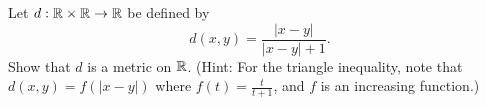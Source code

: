 {\begin{comment}
Suppose $x=y$. Then $d(x,y) = |\ln(1)| = 0$. Conversely, suppose $d(x,y) = 0$. Then $|\ln(y/x)| = 0$. This implies that $\frac{y}{x} = 1$ or that $x=y$. 

Finally, we verify the triangle inequality. Let $z \in X$. Then
\begin{align*} 
d(x,y) + d(y,z) &= |\ln(y/x)| + |\ln(z/y)| \\
	&= |\ln(y) - \ln(x)| + |\ln(z) - \ln(y)| \\
	&= |\ln(x) - \ln(y)| + |\ln(y) - \ln(z)| \\
	&\geq |\ln(x) - \ln(z)| \\
	&= d(x,z).
\end{align*}

We conclude that $d$ is a metric on $X$. 

\end{comment}

\item \label{ex:1_over_1_plus_t_metric} Let $d: \mathbb{R} \times \mathbb{R} \to \mathbb{R}$ be defined by 
\[d(x,y) = \frac{|x-y|}{|x-y|+1}.\]
Show that $d$ is a metric on $\mathbb{R}$. (Hint: For the triangle inequality, note that $d(x,y) = f(|x-y|)$ where $f(t) = \frac{t}{t+1}$, and $f$ is an increasing function.)

\begin{comment}

\ExerciseSolution Let $x, y, z \in \R$. By definition, $d(x,y) \geq 0$. Also, 
\[d(x,y) = \frac{|x-y|}{|x-y|+1} = \frac{|y-x|}{|y-x|+1} = d(y,x).\]

If $x=y$, then $|x-y| = 0$ and $d(x,y) = 0$. Conversely, if $d(x,y) = 0$, then it follows that $|x-y| = 0$ or $x=y$. 

Finally, we demonstrate the triangle inequality. Let $f(t) = \frac{t}{t+1}$. Then $d(x,z) = f(|x-z|)$. Since $f'(t) = \frac{1}{(t+1)^2} > 0$ when $t > 0$, we see that $f$ is an increasing function. So
\begin{align*}
d(x,z) &= f(|x-z|)    \\
	&= f(|(x-y)+(y-z)|) \\
	&\leq f(|x-y|+|y-z|) \\
	&= \frac{|x-y|+|y-z|}{(|x-y|+|y-z|+1)} \\
	&= \frac{|x-y|}{(|x-y|+|y-z|+1)} + \frac{|y-z|}{(|x-y|+|y-z|+1)} \\
	&\leq \frac{|x-y|}{(|x-y|+1)} + \frac{|y-z|}{(|y-z|+1)} \\
	&= d(x,y) + d(y,z).
\end{align*}
We conclude that $d$ is a metric. 


\end{comment}}
